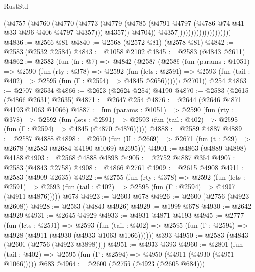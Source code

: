 \begin{lexlean}{RustStd}
\begin{coremodule}
                                          (@4757
                                            (@4760
                                              (@4770
                                                (@4773
                                                  (@4779
                                                    (@4785
                                                      (@4791
                                                        @4797
                                                        (@4786 @74 @41 @33 @496 @406 @4797 @4357)))
                                                    @4357))
                                                @4704))
                                            @4357))))))))))))))))))))
@4836 := @2566 @81
@4840 := @2568 (@2572 @81) (@2578 @81)
@4842 := @2583 (@2532 @2584)
@4843 := @1058 @2102
@4845 := @2583 (@4843 @2611)
@4862 := @2582
    (fun (fn : @7) =>
    @4842
      (@2587
        (@2589
          (fun (params : @1051) =>
          @2590
            (fun (rty : @378) =>
            @2592
              (fun (lets : @2591) =>
              @2593 (fun (tail : @402) => @2595 (fun (Γ : @2594) => @4845 @2656))))))
        @2701))
    @254
@4863 := @2707 @2534
@4866 := @2623 (@2624 @254) @4190
@4870 := @2583 (@2615 (@4866 @2631) @2635)
@4871 := @2647 @254
@4876 := @2644 (@2646 @4871 @4193 @1063 @1066)
@4887 := fun (params : @1051) =>
  @2590
    (fun (rty : @378) =>
    @2592
      (fun (lets : @2591) =>
      @2593 (fun (tail : @402) => @2595 (fun (Γ : @2594) => @4845 (@4870 @4876)))))
@4888 := @2589 @4887
@4889 := @2587 @4888
@4898 := @2670 (fun (U : @2669) => @2671 (fun (t : @29) => @2678 (@2583 (@2684 @4190 @1069) @2695)))
@4901 := @4863 (@4889 @4898) @4188
@4903 := @2568 @4888 @4898
@4905 := @2752 @4887 @354
@4907 := @2583 (@4843 @2758)
@4908 := @4866 @2761
@4909 := @2615 @4908
@4911 := @2583 (@4909 @2635)
@4922 := @2755
    (fun (rty : @378) =>
    @2592
      (fun (lets : @2591) =>
      @2593 (fun (tail : @402) => @2595 (fun (Γ : @2594) => @4907 (@4911 @4876)))))
    @678
@4923 := @2603 @678
@4926 := @2600 (@2756 (@4923 @2608))
@4928 := @2583 (@4843 @4926)
@4929 := @1999 @678
@4930 := @2642 @4929
@4931 := @2645 @4929
@4933 := @4931 @4871 @4193
@4945 := @2777
    (fun (lets : @2591) =>
    @2593
      (fun (tail : @402) => @2595 (fun (Γ : @2594) => @4928 (@4911 (@4930 (@4933 @1063 @1066))))))
    @393
@4950 := @2583 (@4843 (@2600 (@2756 (@4923 @3898))))
@4951 := @4933 @393
@4960 := @2801
    (fun (tail : @402) => @2595 (fun (Γ : @2594) => @4950 (@4911 (@4930 (@4951 @1066)))))
    @683
@4964 := @2600 (@2756 (@4923 (@2605 @684)))

\end{coremodule}
\end{lexlean}
